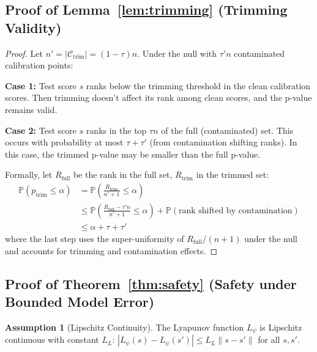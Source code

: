 \documentclass{article}
\theoremstyle{plain}
\theoremstyle{definition}
\newtheorem{assumption}[theorem]{Assumption}
\theoremstyle{remark}
\begin{document}
\subsection{Proof of Lemma~\ref{lem:trimming} (Trimming Validity)}
\label{app:proof_trimming}

\begin{proof}
Let $n' = |\mathcal{C}_{\text{trim}}| = (1-\tau)n$. Under the null with $\tau' n$ contaminated calibration points:

\textbf{Case 1:} Test score $s$ ranks below the trimming threshold in the clean calibration scores. Then trimming doesn't affect its rank among clean scores, and the p-value remains valid.

\textbf{Case 2:} Test score $s$ ranks in the top $\tau n$ of the full (contaminated) set. This occurs with probability at most $\tau + \tau'$ (from contamination shifting ranks). In this case, the trimmed p-value may be smaller than the full p-value.

Formally, let $R_{\text{full}}$ be the rank in the full set, $R_{\text{trim}}$ in the trimmed set:
\begin{align}
\mathbb{P}(p_{\text{trim}} \leq \alpha) &= \mathbb{P}\left(\frac{R_{\text{trim}}}{n'+1} \leq \alpha\right) \\
&\leq \mathbb{P}\left(\frac{R_{\text{full}} - \tau' n}{n'+1} \leq \alpha\right) + \mathbb{P}(\text{rank shifted by contamination}) \\
&\leq \alpha + \tau + \tau'
\end{align}
where the last step uses the super-uniformity of $R_{\text{full}}/(n+1)$ under the null and accounts for trimming and contamination effects.
\end{proof}

\subsection{Proof of Theorem~\ref{thm:safety} (Safety under Bounded Model Error)}
\label{app:proof_safety}

\begin{assumption}[Lipschitz Continuity]
\label{ass:lipschitz}
The Lyapunov function $L_\psi$ is Lipschitz continuous with constant $L_L$: $|L_\psi(s) - L_\psi(s')| \leq L_L \|s - s'\|$ for all $s, s'$.
\end{assumption}
\end{document}
